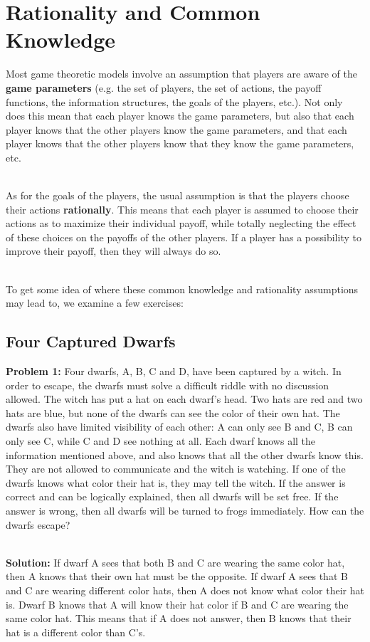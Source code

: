 \documentclass[12pt]{article}
\begin{document}
%
%
\newpage
\section{Rationality and Common Knowledge}
Most game theoretic models involve an assumption that players are aware of the \textbf{game parameters} (e.g. the set of players, the set of actions, the payoff functions, the information structures, the goals of the players, etc.).
Not only does this mean that each player knows the game parameters, but also that each player knows that the other players know the game parameters, and that each player knows that the other players know that they know the game parameters, etc.

\noindent
\\
As for the goals of the players, the usual assumption is that the players choose their actions \textbf{rationally}.
This means that each player is assumed to choose their actions as to maximize their individual payoff, while totally neglecting the effect of these choices on the payoffs of the other players.
If a player has a possibility to improve their payoff, then they will always do so.

\noindent
\\
To get some idea of where these common knowledge and rationality assumptions may lead to, we examine a few exercises:

\subsection{Four Captured Dwarfs}
\textbf{Problem 1:}
Four dwarfs, A, B, C and D, have been captured by a witch.
In order to escape, the dwarfs must solve a difficult riddle with no discussion allowed.
The witch has put a hat on each dwarf's head.
Two hats are red and two hats are blue, but none of the dwarfs can see the color of their own hat.
The dwarfs also have limited visibility of each other: A can only see B and C, B can only see C, while C and D see nothing at all.
Each dwarf knows all the information mentioned above, and also knows that all the other dwarfs know this.
They are not allowed to communicate and the witch is watching.
If one of the dwarfs knows what color their hat is, they may tell the witch.
If the answer is correct and can be logically explained, then all dwarfs will be set free.
If the answer is wrong, then all dwarfs will be turned to frogs immediately.
How can the dwarfs escape?

\noindent
\\
\textbf{Solution:}
If dwarf A sees that both B and C are wearing the same color hat, then A knows that their own hat must be the opposite.
If dwarf A sees that B and C are wearing different color hats, then A does not know what color their hat is.
Dwarf B knows that A will know their hat color if B and C are wearing the same color hat.
This means that if A does not answer, then B knows that their hat is a different color than C's.
\end{document}
